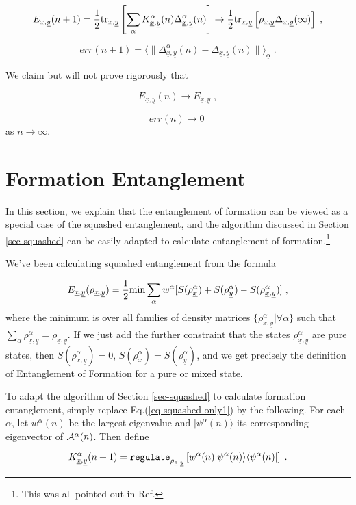 \documentclass[12pt]{article}%
\newcommand{\bra}[1]{\langle#1|}
\newcommand{\ket}[1]{|#1\rangle}
\newcommand{\av}[1]{\langle#1\rangle}
\newcommand{\tr}[0]{{\rm tr }}
\newcommand{\beq}{\begin{equation}}
\newcommand{\eeq}{\end{equation}}
\newcommand{\rarrow}[0]{\rightarrow}
\newcommand{\ul}[1]{\underline{#1}}
\newcommand{\rvx}[0]{{\ul{x}}}
\newcommand{\rvy}[0]{{\ul{y}}}
\newcommand{\cala}[0]{{\cal A}}
\newcommand{\rvalp}[0]{{\ul{\alpha}}}
\newcommand{\alp}[0]{{\alpha}}
\begin{document}
\beq
E_{\rvx, \rvy}(n+1) =
\frac{1}{2}\tr_{\rvx, \rvy} \left[
\sum_\alp K^\alp _{\rvx, \rvy}(n)
\Delta^\alp_{\rvx, \rvy}(n)\right]
\rarrow \frac{1}{2}\tr_{\rvx, \rvy} \left[\rho_{\rvx, \rvy}\Delta_{\rvx, \rvy}(\infty)\right]
\;,
\eeq

\beq
err(n+1)=
\av{\|\Delta^\alp_{\rvx, \rvy}(n)-\Delta_{\rvx, \rvy}(n)\|}_\rvalp
\;.
\eeq


We claim but will not prove rigorously that

\beq
E_{\rvx, \rvy}(n)\rightarrow
E_{\rvx, \rvy}
\;,
\eeq

\beq
err(n)\rightarrow 0
\;
\eeq
as $n\rightarrow \infty$.

\section{Formation Entanglement}

In this section, we explain that the entanglement of formation
can be viewed as a special case of the squashed
entanglement, and the algorithm discussed in Section
\ref{sec-squashed} can be easily
adapted to calculate entanglement of formation.\footnote{This was all pointed out
in Ref.\cite{ab-algo}}

We've been calculating squashed entanglement from the formula

\beq
E_{\rvx, \rvy}(\rho_{\rvx, \rvy})=
\frac{1}{2}
{\rm min}\sum_\alp w^\alp [
S(\rho^\alp_{\rvx})
+S(\rho^\alp_{\rvy})
-S(\rho^\alp_{\rvx, \rvy})]
\;,
\eeq
where the minimum is over all
families of density matrices
$\{\rho^\alp_{\rvx, \rvy}|\forall \alp\}$
such that $\sum_\alp \rho^\alp_{\rvx, \rvy}=
\rho_{\rvx, \rvy}$. If we just add
the further constraint that
the states $\rho^\alp_{\rvx, \rvy}$ are pure states, then
$S(\rho^\alp_{\rvx, \rvy})=0$,
$S(\rho^\alp_{\rvx})=S(\rho^\alp_{\rvy})$,
and we get precisely the definition
of Entanglement of Formation for a pure or mixed state.

To adapt the algorithm of Section \ref{sec-squashed}
to calculate formation entanglement,
simply
replace Eq.(\ref{eq-squashed-only1}) by the following.
For each $\alp$, let $w^\alp(n)$ be the largest eigenvalue
and $\ket{\psi^\alp(n)}$ its corresponding
eigenvector of $
\cala^\alp(n)$.
Then define

\beq
K^\alp_{\rvx, \rvy}(n+1)={\tt regulate}_{\rho_{\rvx, \rvy}}\left[
w^\alp(n)\ket{\psi^\alp(n)}\bra{\psi^\alp(n)}\right]
\;.
\eeq
\end{document}
